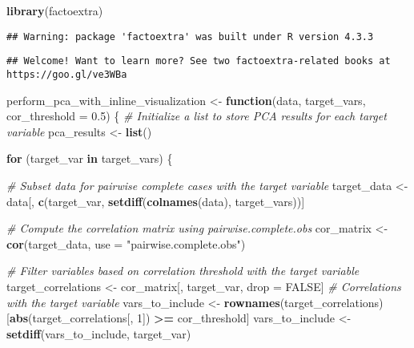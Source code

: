 \documentclass[
]{article}
\newenvironment{Shaded}{\begin{snugshade}}{\end{snugshade}}
\newcommand{\AttributeTok}[1]{\textcolor[rgb]{0.13,0.29,0.53}{#1}}
\newcommand{\CommentTok}[1]{\textcolor[rgb]{0.56,0.35,0.01}{\textit{#1}}}
\newcommand{\ConstantTok}[1]{\textcolor[rgb]{0.56,0.35,0.01}{#1}}
\newcommand{\ControlFlowTok}[1]{\textcolor[rgb]{0.13,0.29,0.53}{\textbf{#1}}}
\newcommand{\DecValTok}[1]{\textcolor[rgb]{0.00,0.00,0.81}{#1}}
\newcommand{\FloatTok}[1]{\textcolor[rgb]{0.00,0.00,0.81}{#1}}
\newcommand{\FunctionTok}[1]{\textcolor[rgb]{0.13,0.29,0.53}{\textbf{#1}}}
\newcommand{\NormalTok}[1]{#1}
\newcommand{\OtherTok}[1]{\textcolor[rgb]{0.56,0.35,0.01}{#1}}
\newcommand{\SpecialCharTok}[1]{\textcolor[rgb]{0.81,0.36,0.00}{\textbf{#1}}}
\newcommand{\StringTok}[1]{\textcolor[rgb]{0.31,0.60,0.02}{#1}}
\begin{document}
\begin{Shaded}
\begin{Highlighting}[]
\FunctionTok{library}\NormalTok{(factoextra)}
\end{Highlighting}
\end{Shaded}

\begin{verbatim}
## Warning: package 'factoextra' was built under R version 4.3.3
\end{verbatim}

\begin{verbatim}
## Welcome! Want to learn more? See two factoextra-related books at https://goo.gl/ve3WBa
\end{verbatim}

\begin{Shaded}
\begin{Highlighting}[]
\NormalTok{perform\_pca\_with\_inline\_visualization }\OtherTok{\textless{}{-}} \ControlFlowTok{function}\NormalTok{(data, target\_vars, }\AttributeTok{cor\_threshold =} \FloatTok{0.5}\NormalTok{) \{}
  \CommentTok{\# Initialize a list to store PCA results for each target variable}
\NormalTok{  pca\_results }\OtherTok{\textless{}{-}} \FunctionTok{list}\NormalTok{()}
  
  \ControlFlowTok{for}\NormalTok{ (target\_var }\ControlFlowTok{in}\NormalTok{ target\_vars) \{}
    
    \CommentTok{\# Subset data for pairwise complete cases with the target variable}
\NormalTok{    target\_data }\OtherTok{\textless{}{-}}\NormalTok{ data[, }\FunctionTok{c}\NormalTok{(target\_var, }\FunctionTok{setdiff}\NormalTok{(}\FunctionTok{colnames}\NormalTok{(data), target\_vars))]}
    
    \CommentTok{\# Compute the correlation matrix using pairwise.complete.obs}
\NormalTok{    cor\_matrix }\OtherTok{\textless{}{-}} \FunctionTok{cor}\NormalTok{(target\_data, }\AttributeTok{use =} \StringTok{"pairwise.complete.obs"}\NormalTok{)}
    
    \CommentTok{\# Filter variables based on correlation threshold with the target variable}
\NormalTok{    target\_correlations }\OtherTok{\textless{}{-}}\NormalTok{ cor\_matrix[, target\_var, drop }\OtherTok{=} \ConstantTok{FALSE}\NormalTok{]  }\CommentTok{\# Correlations with the target variable}
\NormalTok{    vars\_to\_include }\OtherTok{\textless{}{-}} \FunctionTok{rownames}\NormalTok{(target\_correlations)[}\FunctionTok{abs}\NormalTok{(target\_correlations[, }\DecValTok{1}\NormalTok{]) }\SpecialCharTok{\textgreater{}=}\NormalTok{ cor\_threshold]}
\NormalTok{    vars\_to\_include }\OtherTok{\textless{}{-}} \FunctionTok{setdiff}\NormalTok{(vars\_to\_include, target\_var)}


\end{Highlighting}
\end{Shaded}
\end{document}

